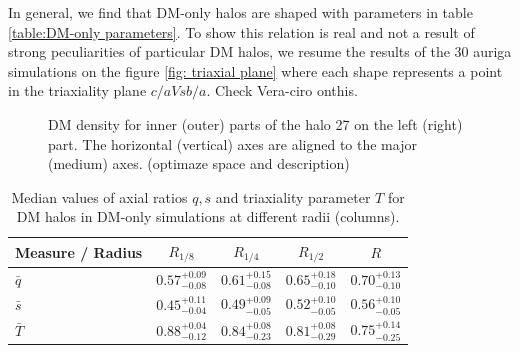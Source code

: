 \documentclass[a4paper,fleqn,usenatbib]{mnras}
\begin{document}
In general, we find that DM-only halos are shaped with parameters in table \ref{table:DM-only parameters}. To show this relation is real and not a result of strong peculiarities of particular DM halos, we resume the results of the 30 auriga simulations on the figure \ref{fig: triaxial plane} where each shape represents a point in the triaxiality plane $c/a Vs b/a$. Check Vera-ciro onthis.\\

 

\begin{figure}
  \centering
  \hfill
  \hfill
  \caption{DM density for inner (outer) parts of the halo 27 on the left (right) part. The horizontal (vertical) axes are aligned to the major (medium) axes. (optimaze space and description) }
  \label{fig:slices}
\end{figure}

\begin{table}
\begin{tabular}{l|cccc}
Measure / Radius& $R_{1/8}$& $R_{1/4}$& $R_{1/2}$& $R$\\
\hline \hline
$\bar{q}$&$0.57^{+0.09}_{-0.08}$&$0.61^{+0.15}_{-0.08}$&$0.65^{+0.18}_{-0.10}$&$0.70^{+0.13}_{-0.10}$ \\ [0.1cm]
$\bar{s}$&$0.45^{+0.11}_{-0.04}$&$0.49^{+0.09}_{-0.05}$&$0.52^{+0.10}_{-0.05}$&$0.56^{+0.10}_{-0.05}$ \\ [0.1cm]
$\bar{T}$&$0.88^{+0.04}_{-0.12}$&$0.84^{+0.08}_{-0.23}$&$0.81^{+0.08}_{-0.29}$&$0.75^{+0.14}_{-0.25}$ \\ 

\hline
\end{tabular}
\caption{Median values of axial ratios $q,s$ and triaxiality parameter $T$ for DM halos in DM-only simulations at different radii (columns). }
\label{tabe:DM table}
\end{table}
\end{document}
